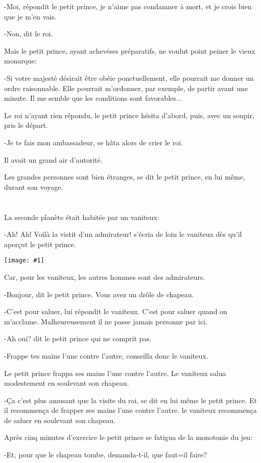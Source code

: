 \documentclass{report}
\newcommand{\parachapter}[2][]{\chapter[#1]{#2}}
\newcommand{\incpic}[1]{%
\begin{center}
    \texttt{[image: \#1]}
\end{center}%
}
\begin{document}
-Moi, répondit le petit prince, je n'aime pas condamner à mort, et je crois bien que je m'en vais.

-Non, dit le roi.

Mais le petit prince, ayant achevéses préparatifs, ne voulut point peiner le vieux monarque:

-Si votre majesté désirait être obéie ponctuellement, elle pourrait me donner un ordre raisonnable. Elle pourrait m'ordonner, par exemple, de partir avant une minute. Il me semble que les conditions sont favorables...

Le roi n'ayant rien répondu, le petit prince hésita d'abord, puis, avec un soupir, pris le départ.

-Je te fais mon ambassadeur, se hâta alors de crier le roi.

Il avait un grand air d'autorité.

Les grandes personnes sont bien étranges, se dit le petit prince, en lui même, durant son voyage.

\parachapter{} %

La seconde planète était habitée par un vaniteux:

-Ah! Ah! Voilà la vistit d'un admirateur! s'écria de loin le vaniteux dès qu'il aperçut le petit prince. 

\incpic{pic/image26.jpeg}

Car, pour les vaniteux, les autres hommes sont des admirateurs.

-Bonjour, dit le petit prince. Vous avez un drôle de chapeau.

-C'est pour saluer, lui répondit le vaniteux. C'est pour saluer quand on m'acclame. Malheureusement il ne passe jamais personne par ici.

-Ah oui? dit le petit prince qui ne comprit pas.

-Frappe tes mains l'une contre l'autre, conseilla donc le vaniteux.

Le petit prince frappa ses mains l'une contre l'autre. Le vaniteux salua modestement en soulevant son chapeau.

-Ça c'est plus amusant que la visite du roi, se dit en lui même le petit prince. Et il recommença de frapper ses mains l'une contre l'autre. le vaniteux recommença de saluer en soulevant son chapeau.

Après cinq minutes d'exercice le petit prince se fatigua de la monotonie du jeu:

-Et, pour que le chapeau tombe, demanda-t-il, que faut=il faire?
\end{document}
